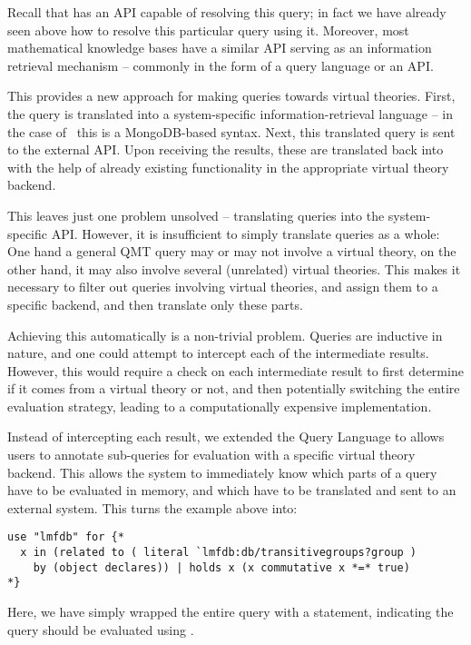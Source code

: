 Recall that \lmfdb has an API capable of resolving this query; in fact we have already seen above how to resolve this particular query using it. 
Moreover, most mathematical knowledge bases have a similar API serving as an information retrieval mechanism -- commonly in the form of a query language or an API. 

This provides a new approach for making queries towards virtual theories. 
First, the \mmt query is translated into a system-specific information-retrieval language -- in the case of \lmfdb\ this is a MongoDB-based syntax.
Next, this translated query is sent to the external API. 
Upon receiving the results, these are translated back into \ommt with the help of already existing functionality in the appropriate virtual theory backend.

This leaves just one problem unsolved -- translating queries into the system-specific API. 
However, it is insufficient to simply translate queries as a whole: 
One hand a general QMT query may or may not involve a virtual theory, on the other hand, it may also involve several (unrelated) virtual theories. 
This makes it necessary to filter out queries involving virtual theories, and assign them to a specific backend, and then translate only these parts. 

Achieving this automatically is a non-trivial problem. 
Queries are inductive in nature, and one could attempt to intercept each of the intermediate results. 
However, this would require a check on each intermediate result to first determine if it comes from a virtual theory or not, and then potentially switching the entire evaluation strategy, leading to a computationally expensive implementation. 

Instead of intercepting each result, we extended the Query Language to allows users to annotate sub-queries for evaluation with a specific virtual theory backend. 
This allows the system to immediately know which parts of a query have to be evaluated in \mmt memory, and which have to be translated and sent to an external system. 
This turns the example above into:
\begin{lstlisting}[language=qmt]
use "lmfdb" for {*
  x in (related to ( literal `lmfdb:db/transitivegroups?group ) 
    by (object declares)) | holds x (x commutative x *=* true)
*}
\end{lstlisting}
Here, we have simply wrapped the entire query with a  statement, indicating the query should be evaluated using \lmfdb. 


